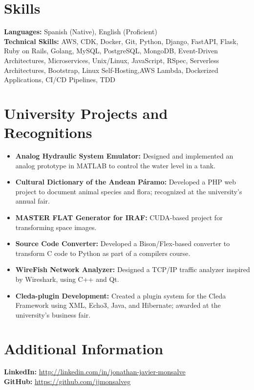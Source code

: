 \documentclass[a4paper,10pt]{article}
\begin{document}
\section*{Skills}
\textbf{Languages:} Spanish (Native), English (Proficient) \\
\textbf{Technical Skills:} AWS, CDK, Docker, Git, Python, Django, FastAPI, Flask, Ruby on Rails, Golang,  MySQL, PostgreSQL, MongoDB, Event-Driven Architectures, Microservices, Unix/Linux, JavaScript, RSpec, Serverless Architectures, Bootstrap, Linux Self-Hosting,AWS Lambda, Dockerized Applications, CI/CD Pipelines, TDD

\section*{University Projects and Recognitions}
\begin{itemize}[leftmargin=0.5cm]
    \item \textbf{Analog Hydraulic System Emulator:} Designed and implemented an analog prototype in MATLAB to control the water level in a tank.
    \item \textbf{Cultural Dictionary of the Andean Páramo:} Developed a PHP web project to document animal species and flora; recognized at the university's annual fair.
    \item \textbf{MASTER FLAT Generator for IRAF:} CUDA-based project for transforming space images.
    \item \textbf{Source Code Converter:} Developed a Bison/Flex-based converter to transform C code to Python as part of a compilers course.
    \item \textbf{WireFish Network Analyzer:} Designed a TCP/IP traffic analyzer inspired by Wireshark, using C++ and Qt.
    \item \textbf{Cleda-plugin Development:} Created a plugin system for the Cleda Framework using XML, Echo3, Java, and Hibernate; awarded at the university's business fair.
\end{itemize}

\section*{Additional Information}
\textbf{LinkedIn:} \url{http://linkedin.com/in/jonathan-javier-monsalve} \\
\textbf{GitHub:} \url{https://github.com/jjmonsalveg}
\end{document}
